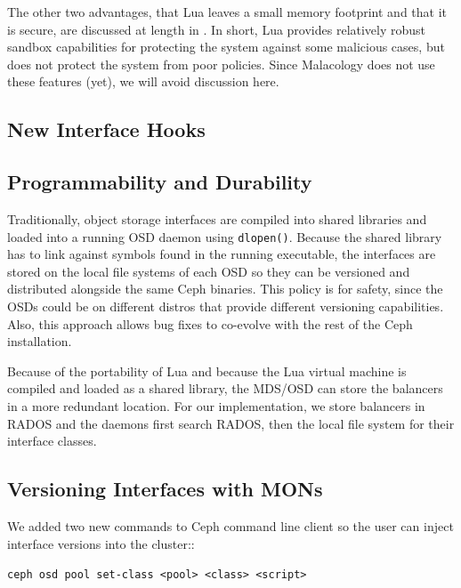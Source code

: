 \documentclass[10pt,twocolumn]{article}
\begin{document}
The other two advantages, that Lua leaves a small memory footprint and
that it is secure, are discussed at length in 
\cite{ierusalimschy_programming_2006,neto:dls14-luaos}. In short, Lua
provides relatively robust sandbox capabilities for protecting the
system against some malicious cases, but does not protect the system
from poor policies. Since Malacology does not use these features (yet),
we will avoid discussion here.

\subsection{New Interface Hooks}\label{new-interface-hooks}


\fi


\iffalse


\subsection{Programmability and Durability}

Traditionally, object storage interfaces are compiled into shared
libraries and loaded into a running OSD daemon using \texttt{dlopen()}.
Because the shared library has to link against symbols found in the
running executable, the interfaces are stored on the local file systems
of each OSD so they can be versioned and distributed alongside the same
Ceph binaries. This policy is for safety, since the OSDs could be on
different distros that provide different versioning capabilities. Also,
this approach allows bug fixes to co-evolve with the rest of the Ceph
installation.

Because of the portability of Lua and because the Lua virtual machine is
compiled and loaded as a shared library, the MDS/OSD can store the
balancers in a more redundant location. For our implementation, we store
balancers in RADOS and the daemons first search RADOS, then the local
file system for their interface classes.

\subsection{Versioning Interfaces with
MONs}\label{versioning-interfaces-with-mons}

We added two new commands to Ceph command line client so the user can
inject interface versions into the cluster::

\noindent \texttt{ceph\ osd\ pool\ set-class\ \textless{}pool\textgreater{}\ \textless{}class\textgreater{}\ \textless{}script\textgreater{}}
\end{document}
